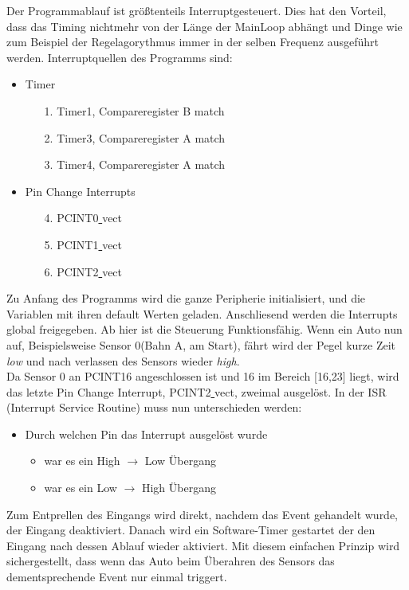 \documentclass[a4paper, 11pt]{scrartcl}
\begin{document}
Der Programmablauf ist größtenteils Interruptgesteuert.
			Dies hat den Vorteil, dass das Timing nichtmehr von der Länge der MainLoop abhängt und Dinge wie zum  Beispiel der Regelagorythmus immer in der selben Frequenz ausgeführt werden.
			Interruptquellen des Programms sind:
			\begin{itemize}
				\item Timer
				\begin{itemize}
					\item[1.] Timer1, Compareregister B match
					\item[2.] Timer3, Compareregister A match
					\item[3.] Timer4, Compareregister A match
				\end{itemize}
				\item Pin Change Interrupts
				\begin{itemize}
					\item[4.] PCINT0\underline{ }vect
					\item[5.] PCINT1\underline{ }vect
					\item[6.] PCINT2\underline{ }vect
				\end{itemize}
			\end{itemize}
			\newpage
			Zu Anfang des Programms wird die ganze Peripherie initialisiert, und die Variablen mit ihren default Werten geladen.
			Anschliesend werden die Interrupts global freigegeben. Ab hier ist die Steuerung Funktionsfähig.
			Wenn ein Auto nun auf, Beispielsweise Sensor 0(Bahn A, am Start), fährt wird der Pegel kurze Zeit \emph{low} und nach verlassen des Sensors wieder \emph{high}.\\ Da Sensor 0 an PCINT16 angeschlossen ist und 16 im Bereich [16,23] liegt, wird das letzte Pin Change Interrupt, PCINT2\underline{ }vect, zweimal ausgelöst. In der ISR (Interrupt Service Routine) muss nun unterschieden werden:
			\begin{itemize}
				\item Durch welchen Pin das Interrupt ausgelöst wurde
				\begin{itemize}
					\item war es ein High $\rightarrow$ Low Übergang
					\item war es ein Low $\rightarrow$ High Übergang
				\end{itemize}
			\end{itemize}
			Zum Entprellen des Eingangs wird direkt, nachdem das Event gehandelt wurde, der Eingang deaktiviert. Danach wird ein Software-Timer gestartet der den Eingang nach dessen Ablauf wieder aktiviert. Mit diesem einfachen Prinzip wird sichergestellt, dass wenn das Auto beim Überahren des Sensors das dementsprechende Event nur einmal triggert.
\end{document}
